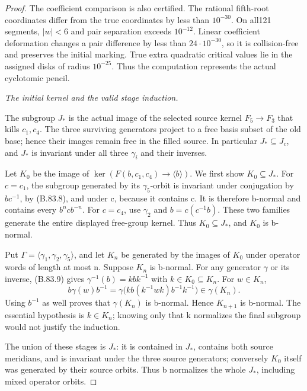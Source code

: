 \begin{proof}
The coefficient comparison is also certified. The rational fifth-root
coordinates differ from the true coordinates by less than \(10^{-30}\).
On all121 segments, \(|w|<6\) and pair separation exceeds
\(10^{-12}\). Linear coefficient deformation changes a pair
difference by less than \(24\cdot10^{-30}\), so it is collision-free
and preserves the initial marking. True extra quadratic critical
values lie in the assigned disks of radius \(10^{-25}\). Thus
the computation represents the actual cyclotomic pencil.

\emph{The initial kernel and the valid stage induction.}\par
The subgroup \(J_*\) is the actual image of the selected source
kernel \(F_5\to F_3\) that kills \(c_1,c_4\). The three surviving
generators project to a free basis subset of the old base; hence
their images remain free in the filled source. In particular
\(J_*\subseteq J_c\), and \(J_*\) is invariant under all three
\(\gamma_i\) and their inverses.

Let \(K_0\) be the image of
\(\ker(F(b,c_1,c_4)\to\langle b\rangle)\). We first show
\(K_0\subseteq J_*\). For \(c=c_1\), the subgroup generated
by its \(\gamma_5\)-orbit is invariant under conjugation by
\(bc^{-1}\), by (B.83.8), and under c, because it contains c.
It is therefore b-normal and contains every \(b^ncb^{-n}\).
For \(c=c_4\), use \(\gamma_2\) and \(b=c(c^{-1}b)\).
These two families generate the entire displayed free-group
kernel. Thus \(K_0\subseteq J_*\), and \(K_0\) is b-normal.

Put \(\Gamma=\langle\gamma_1,\gamma_2,\gamma_5\rangle\), and
let \(K_n\) be generated by the images of \(K_0\) under operator
words of length at most n. Suppose \(K_n\) is b-normal.
For any generator \(\gamma\) or its inverse, (B.83.9) gives
\(\gamma^{-1}(b)=kbk^{-1}\) with \(k\in K_0\subseteq K_n\).
For \(w\in K_n\),
\[
 b\gamma(w)b^{-1}
   =\gamma\bigl(kb(k^{-1}wk)b^{-1}k^{-1}\bigr)
                     \in\gamma(K_n).
\tag{B.83.10}
\]
Using \(b^{-1}\) as well proves that \(\gamma(K_n)\) is
b-normal. Hence \(K_{n+1}\) is b-normal. The essential
hypothesis is \(k\in K_n\); knowing only that k normalizes
the final subgroup would not justify the induction.

The union of these stages is \(J_*\): it is contained in
\(J_*\), contains both source meridians, and is invariant
under the three source generators; conversely \(K_0\) itself
was generated by their source orbits. Thus b normalizes the
whole \(J_*\), including mixed operator orbits.


\end{proof}
